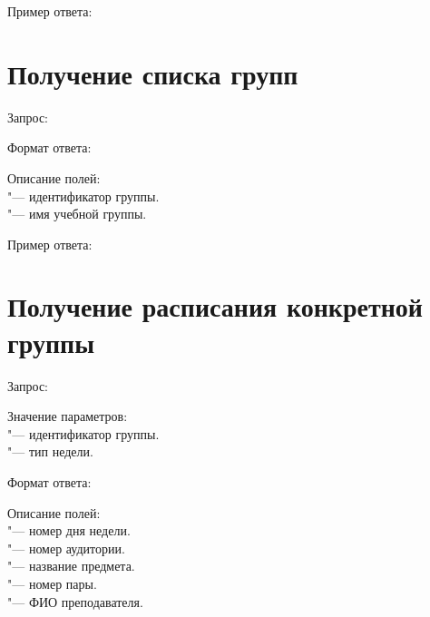 Пример ответа:
\begin{listing}[H]
\end{listing}
\vspace{-0.75cm}

\section{Получение списка групп}
\label{sec:groups}

Запрос: 

Формат ответа:
\begin{listing}[H]
\end{listing}
\vspace{-0.75cm}

Описание полей:\\
 "--- идентификатор группы.\\
 "--- имя учебной группы.

Пример ответа:
\begin{listing}[H]
\end{listing}
\vspace{-0.75cm}

\section{Получение расписания конкретной группы}
\label{sec:group}

Запрос: 

Значение параметров:\\
 "--- идентификатор группы.\\
 "--- тип недели.

Формат ответа:
\begin{listing}[H]
\end{listing}
\vspace{-0.75cm}

Описание полей:\\
 "--- номер дня недели.\\
 "--- номер аудитории.\\
 "--- название предмета.\\
 "--- номер пары.\\
 "--- ФИО преподавателя.

